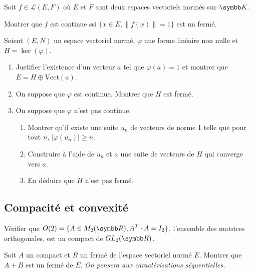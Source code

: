 \begin{exercice}
    Soit $f \in \mathscr L(E,F)$ où $E$ et $F$ sont deux espaces vectoriels normés sur $\K$.

    Montrer que $f$ est continue ssi $\{x \in E, \|f(x)\| = 1\}$ est un fermé.
\end{exercice}

\begin{exercice}
    Soient $(E, N)$ un espace vectoriel normé, $\varphi$ une forme linéaire non nulle et $H = \ker(\varphi)$.
    \begin{enumerate}
        \item Justifier l'existence d'un vecteur $a$ tel que $\varphi(a)=1$ et montrer que $E = H \oplus \text{Vect}(a)$.
        \item On suppose que $\varphi$ est continue. Montrer que $H$ est fermé.
        \item On suppose que $\varphi$ n'est pas continue.
        \begin{enumerate}
            \item Montrer qu'il existe une suite $u_{n}$ de vecteurs de norme 1 telle que pour tout $n$, $|\varphi(u_{n})| \geqslant n$.
            \item Construire à l'aide de $u_{n}$ et $a$ une suite de vecteurs de $H$ qui converge vers $a$.
            \item En déduire que $H$ n'est pas fermé.
        \end{enumerate}
    \end{enumerate}
\end{exercice}

\subsection{Compacité et convexité}
\begin{exercice}
    Vérifier que $O(2) = \{A \in M_2 (\R), A^T \cdot A = I_2\}$, 
    l'ensemble des matrices orthogonales, est un compact de $GL_{2}(\R)$.
\end{exercice}

\begin{exercice}
    Soit $A$ un compact et $B$ un fermé de l'espace vectoriel normé $E$.
    Montrer que $A+B$ est un fermé de $E$.
    \textit{On pensera aux caractérisations séquentielles.}
\end{exercice}


